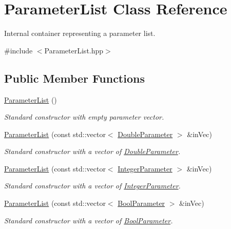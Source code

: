 \hypertarget{class_parameter_list}{\section{Parameter\-List Class Reference}
\label{class_parameter_list}
}


Internal container representing a parameter list.  




{\ttfamily \#include $<$Parameter\-List.\-hpp$>$}

\subsection*{Public Member Functions}
\begin{DoxyCompactItemize}
\item 
\hyperlink{class_parameter_list_a81cb788ca476171256c82f0416b584c6}{Parameter\-List} ()
\begin{DoxyCompactList}\small\item\em Standard constructor with empty parameter vector. \end{DoxyCompactList}\item 
\hyperlink{class_parameter_list_ab33e6f5f5f766af5ecfb4241be0f4f78}{Parameter\-List} (const std\-::vector$<$ \hyperlink{class_double_parameter}{Double\-Parameter} $>$ \&in\-Vec)
\begin{DoxyCompactList}\small\item\em Standard constructor with a vector of \hyperlink{class_double_parameter}{Double\-Parameter}. \end{DoxyCompactList}\item 
\hyperlink{class_parameter_list_a7253d65f60c0b981ea59038b64c1632b}{Parameter\-List} (const std\-::vector$<$ \hyperlink{class_integer_parameter}{Integer\-Parameter} $>$ \&in\-Vec)
\begin{DoxyCompactList}\small\item\em Standard constructor with a vector of \hyperlink{class_integer_parameter}{Integer\-Parameter}. \end{DoxyCompactList}\item 
\hyperlink{class_parameter_list_aaeac52b9c62c25950d1d7f3e83ce4213}{Parameter\-List} (const std\-::vector$<$ \hyperlink{class_bool_parameter}{Bool\-Parameter} $>$ \&in\-Vec)
\begin{DoxyCompactList}\small\item\em Standard constructor with a vector of \hyperlink{class_bool_parameter}{Bool\-Parameter}. \end{DoxyCompactList}\item 

\end{DoxyCompactItemize}
